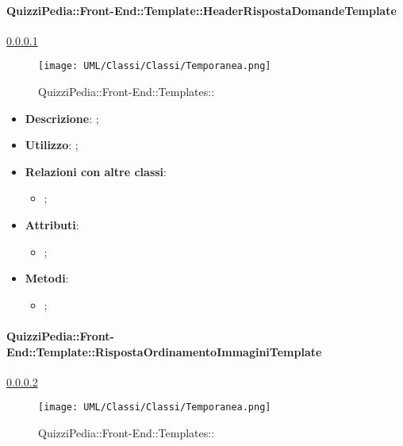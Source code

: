 		\paragraph{QuizziPedia::Front-End::Template::HeaderRispostaDomandeTemplate}
		
				\label{QuizziPedia::Front-End::Templates::HeaderRispostaDomandeTemplate}
				\ref{QuizziPedia::Front-End::Templates::HeaderRispostaDomandeTemplate}
				\begin{figure}[h]
					\centering
					\texttt{[image: UML/Classi/Classi/Temporanea.png]}
					\caption{QuizziPedia::Front-End::Templates::}
				\end{figure}
		
			\begin{itemize}
				\item \textbf{Descrizione}: ;
				\item \textbf{Utilizzo}: ;
				\item \textbf{Relazioni con altre classi}: 
				\begin{itemize}
					\item ;
				\end{itemize}
				\item \textbf{Attributi}: 
				\begin{itemize}
					\item ;
				\end{itemize}
				\item \textbf{Metodi}: 
				\begin{itemize}
					\item ;
				\end{itemize}
			\end{itemize}

		\paragraph{QuizziPedia::Front-End::Template::RispostaOrdinamentoImmaginiTemplate}
		
				\label{QuizziPedia::Front-End::Templates::}
				\ref{QuizziPedia::Front-End::Templates::}
				\begin{figure}[h]
					\centering
					\texttt{[image: UML/Classi/Classi/Temporanea.png]}
					\caption{QuizziPedia::Front-End::Templates::}
				\end{figure}
				
